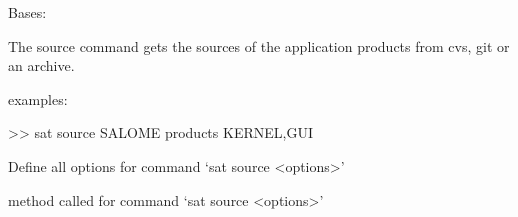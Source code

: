 \documentclass[a4paper,10pt,english]{sphinxmanual}
\begin{document}
\begin{fulllineitems}
\label{\detokenize{apidoc_commands/commands:commands.source.Command}}
Bases: 

The source command gets the sources of the application products
from cvs, git or an archive.

\begin{DUlineblock}{0em}
\item[] examples:
\item[] \textgreater{}\textgreater{} sat source SALOME \textendash{}products KERNEL,GUI
\end{DUlineblock}

\begin{fulllineitems}
\label{\detokenize{apidoc_commands/commands:commands.source.Command.getParser}}
Define all options for command ‘sat source \textless{}options\textgreater{}’

\end{fulllineitems}


\begin{fulllineitems}
\label{\detokenize{apidoc_commands/commands:commands.source.Command.name}}
\end{fulllineitems}


\begin{fulllineitems}
\label{\detokenize{apidoc_commands/commands:commands.source.Command.run}}
method called for command ‘sat source \textless{}options\textgreater{}’

\end{fulllineitems}


\end{fulllineitems}

\end{document}
